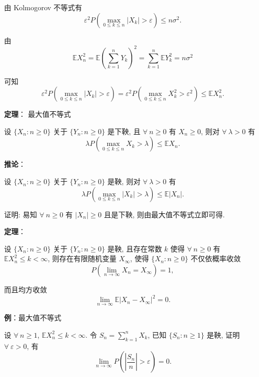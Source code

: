 \documentclass[openany]{ctexbook}
\theoremstyle{kaiti}
\theoremstyle{normal}
\begin{document}
由 Kolmogorov 不等式有
\begin{equation}
  \varepsilon^2P\left(\max_{0\leqslant k\leqslant n}|X_k|>\varepsilon\right)\leqslant n\sigma^2.
\end{equation}

由
\begin{equation}
  \mathbb{E}X_n^2=\mathbb{E}\left(\sum_{k=1}^nY_k\right)^2=\sum_{k=1}^n\mathbb{E}Y_k^2=n\sigma^2
\end{equation}

可知
\begin{equation}
  \varepsilon^2P\left(\max_{0\leqslant k\leqslant n}|X_k|>\varepsilon\right)=\varepsilon^2P\left(\max_{0\leqslant k\leqslant n}X_k^2>\varepsilon^2\right)\leqslant \mathbb{E}X_n^2.
\end{equation}

\textbf{定理}： 最大值不等式

设 $\{X_n:n\geqslant0\}$ 关于 $\{Y_n:n\geqslant0\}$ 是下鞅, 且 $\forall~n\geqslant0$ 有 $X_n\geqslant0$, 则对 $\forall~\lambda>0$ 有
\begin{equation}
  \lambda P\left(\max_{0\leqslant k\leqslant n}X_k>\lambda\right)\leqslant \mathbb{E}X_n.
\end{equation}

\textbf{推论}：

设 $\{X_n:n\geqslant0\}$ 关于 $\{Y_n:n\geqslant0\}$ 是鞅, 则对 $\forall~\lambda>0$ 有
\begin{equation}
  \lambda P\left(\max_{0\leqslant k\leqslant n}|X_k|>\lambda\right)\leqslant \mathbb{E}|X_n|.
\end{equation}

证明: 易知 $\forall~n\geqslant0$ 有 $|X_n|\geqslant0$ 且是下鞅, 则由最大值不等式立即可得.

\textbf{定理}：

设 $\{X_n:n\geqslant0\}$ 关于 $\{Y_n:n\geqslant0\}$ 是鞅, 且存在常数 $k$ 使得 $\forall~n\geqslant0$ 有 $\mathbb{E}X_n^2\leqslant k<\infty$, 则存在有限随机变量 $X_\infty$, 使得 $\{X_n:n\geqslant0\}$ 不仅依概率收敛
\begin{equation}
  P\left(\lim_{n\to\infty}X_n=X_\infty\right)=1,
\end{equation}

而且均方收敛
\begin{equation}
  \lim_{n\to\infty}\mathbb{E}|X_n-X_\infty|^2=0.
\end{equation}

\textbf{例}：最大值不等式

设 $\forall~n\geqslant1$, $\mathbb{E}X_n^2\leqslant k<\infty$. 令 $S_n=\sum_{k=1}^nX_k$, 已知 $\{S_n:n\geqslant1\}$ 是鞅, 证明 $\forall~\varepsilon>0$, 有
\begin{equation}
  \lim_{n\to\infty}P\left(\left|\frac{S_n}{n}\right|>\varepsilon\right)=0.
\end{equation}
\end{document}
